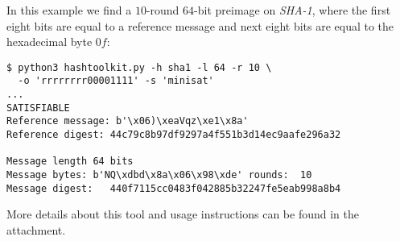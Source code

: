 In this example we find a $10$-round $64$-bit preimage on \emph{SHA-1}, where the first eight bits are equal to a reference message and next eight bits are equal to the hexadecimal byte $0f$:

\begin{verbatim}
$ python3 hashtoolkit.py -h sha1 -l 64 -r 10 \
  -o 'rrrrrrrr00001111' -s 'minisat'
...
SATISFIABLE
Reference message: b'\x06)\xeaVqz\xe1\x8a'
Reference digest: 44c79c8b97df9297a4f551b3d14ec9aafe296a32

Message length 64 bits
Message bytes: b'NQ\xdbd\x8a\x06\x98\xde' rounds:  10
Message digest:   440f7115cc0483f042885b32247fe5eab998a8b4
\end{verbatim}

More details about this tool and usage instructions can be found in the attachment.


